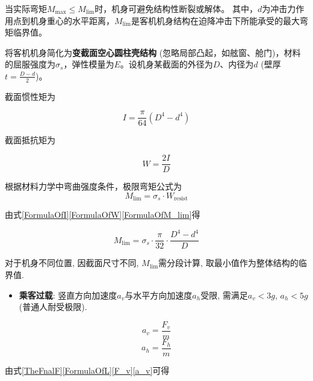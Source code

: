 \documentclass{cumcmthesis}
\begin{document}
    当实际弯矩$M_{\text{max}} \leq M_{\text{lim}}$时，机身可避免结构性断裂或解体。
    其中，$d$为冲击力作用点到机身重心的水平距离，$M_{\text{lim}}$是客机机身结构在迫降冲击下所能承受的最大弯矩临界值。

   将客机机身简化为\textbf{变截面空心圆柱壳结构} (忽略局部凸起，如舷窗、舱门)，材料的屈服强度为$\sigma_s$，弹性模量为$E$。设机身某截面的外径为$D$、内径为$d$ (壁厚$t=\frac{D-d}{2}$)。
   
   截面惯性矩为
    
   \begin{equation}
   I = \frac{\pi}{64}(D^4 - d^4)
   \label{FormulaOfI}
   \end{equation}

   截面抵抗矩为
   
   \begin{equation}
   W = \frac{2I}{D}
    \label{FormulaOfW}
    \end{equation}
   
  根据材料力学中弯曲强度条件，极限弯矩公式为
   \begin{equation}
    M_{\text{lim}} = \sigma_s \cdot W_{\text{resist}}
    \label{FormulaOfM_lim}
    \end{equation}

  由式\eqref{FormulaOfI}\eqref{FormulaOfW}\eqref{FormulaOfM_lim}得

  \begin{equation}
  M_{\text{lim}} = \sigma_s \cdot \frac{\pi}{32} \cdot \frac{D^4 - d^4}{D}
    \label{formulaOfM_lim}
  \end{equation}
  
  对于机身不同位置, 因截面尺寸不同, $M_{\text{lim}}$需分段计算, 取最小值作为整体结构的临界值. 


\begin{itemize}

\item \textbf{乘客过载}: 竖直方向加速度$a_v$与水平方向加速度$a_h$受限,  
需满足$a_v < 3g$, $a_h < 5g$ (普通人耐受极限). 

\end{itemize}

\begin{equation}
a_v = \frac{F_v}{m} 
\label{a_v}
\end{equation}
\begin{equation}
a_h = \frac{F_h}{m} 
\label{a_h}
\end{equation}


由式\eqref{TheFnalF}\eqref{FormulaOfL}\eqref{F_v}\eqref{a_v}可得 
\end{document}
